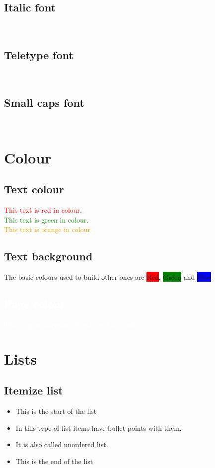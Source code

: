 \documentclass{article}
\begin{document}
\subsection{Italic font}
\textit{\blindtext}\\
\subsection{Teletype font}
\texttt{\blindtext}\\
\subsection{Small caps font}
\textsc{\blindtext}\\

\section{Colour}
\subsection{Text colour}
\textcolor{red}{This text is red in colour.} \\
\textcolor{green}{This text is green in colour.}\\
\textcolor{orange}{This text is orange in colour}\\
\subsection{Text background}
The basic colours used to build other ones are \colorbox{red}{Red}, \colorbox{green}{Green} and \colorbox{blue}{Blue}
\newpage
\pagecolor{black}
\color{white}
\subsection{\textcolor{white}{Page colour}}
\vspace{100mm}
\begin{center}
    \textcolor{white}{This page is intentionally coloured in black}
\end{center}
\newpage
\pagecolor{white}
\color{black}
\section{Lists}
\subsection{Itemize list}
\begin{itemize}
    \item This is the start of the list
    \item In this type of list items have bullet points with them.
    \item It is also called unordered list.
    \item This is the end of the list
\end{itemize}
\end{document}
